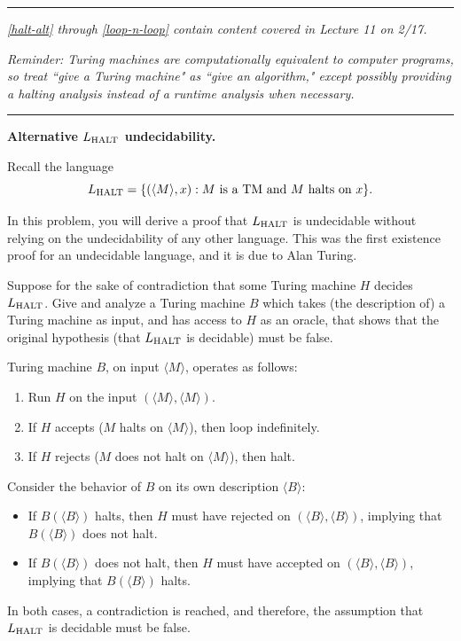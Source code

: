\documentclass[11pt,addpoints,answers]{exam}
\begin{document}
\begin{questions}
  \ifprintanswers
  \else
  \pagebreak
  \fi
  \pagebreak
  
\medskip \hrule \medskip 
\emph{\cref{halt-alt} through \cref{loop-n-loop} contain content covered in Lecture 11 on 2/17.}

\emph{Reminder: Turing machines are computationally equivalent to computer programs, so treat ``give a Turing machine" as ``give an algorithm," except possibly providing a halting analysis instead of a runtime analysis when necessary.}

\medskip \hrule \medskip

  \question [8] \textbf{Alternative $L_{\text{HALT}}$ undecidability.}  \label{halt-alt}
  
  \nopagebreak

  Recall the language
  \[
        L_{\text{HALT}} = \{(\langle M\rangle,x): \text{$M$ is a TM and $M$ halts on $x$}\} \text .
  \]
  
  In this problem, you will derive a proof that $L_{\text{HALT}}$ is undecidable without relying on the undecidability of any other language.
  This was the first existence proof for an undecidable language, and it is due to Alan Turing.

    
Suppose for the sake of contradiction that some Turing machine $H$ decides $L_{\text{HALT}}$. Give and analyze a Turing machine $B$ which takes (the description of) a Turing machine as input, and has access to $H$ as an oracle, that shows that the original  hypothesis (that $L_{\text{HALT}}$ is decidable) must be false.


    \begin{solution}
    Turing machine $B$, on input $\langle M \rangle$, operates as follows:
    \begin{enumerate}
        \item Run $H$ on the input $(\langle M \rangle, \langle M \rangle)$.
        \item If $H$ accepts ($M$ halts on $\langle M \rangle$), then loop indefinitely.
        \item If $H$ rejects ($M$ does not halt on $\langle M \rangle$), then halt.
    \end{enumerate}
    Consider the behavior of $B$ on its own description $\langle B \rangle$:
    \begin{itemize}
        \item If $B(\langle B \rangle)$ halts, then $H$ must have rejected on $(\langle B \rangle, \langle B \rangle)$, implying that $B(\langle B \rangle)$ does not halt.
        \item If $B(\langle B \rangle)$ does not halt, then $H$ must have accepted on $(\langle B \rangle, \langle B \rangle)$, implying that $B(\langle B \rangle)$ halts.
    \end{itemize}
    In both cases, a contradiction is reached, and therefore, the assumption that $L_{\text{HALT}}$ is decidable must be false.
    \end{solution}


\end{questions}
\end{document}
